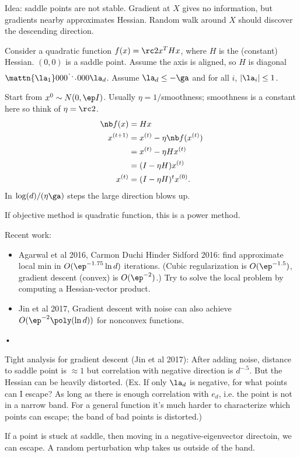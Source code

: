 Idea: saddle points are not stable. Gradient at $X$ gives no information, but gradients nearby approximates Hessian. Random walk around $X$ should discover the descending direction.

Consider a quadratic function $f(x) = \rc 2 x^THx$, where $H$ is the (constant) Hessian. $(0,0)$ is a saddle point. Assume the axis is aligned, so $H$ is diagonal $\mattn{\la_1}000{\ddots}000{\la_d}$.
Assume $\la_d\le -\ga$ and for all $i$, $|\la_i|\le 1$. 

Start from $x^0\sim N(0,\ep I)$.  Usually $\eta=1/$smoothness; smoothness is a constant here so think of $\eta=\rc2$.
\begin{align}
\nb f(x) &= Hx\\
x^{(t+1)}  &= x^{(t)} - \eta \nb f(x^{(t)}) \\
&= x^{(t) } - \eta Hx^{(t)}\\
&= (I-\eta H)x^{(t)}\\
x^{(t)} &= (I-\eta H)^t x^{(0)}.
\end{align}
In $\log (d)/(\eta\ga)$ steps the large direction blows up.


If objective method is quadratic function, this is a power method.

Recent work:
\begin{itemize}
\item
Agarwal et al 2016, Carmon Duchi Hinder Sidford 2016: find approximate local min in $O(\ep^{-1.75}\ln d)$ iterations. (Cubic regularization is $O(\ep^{-1.5})$, gradient descent (convex) is $O(\ep^{-2})$.) Try to solve the local problem by computing a Hessian-vector product.
\item
Jin et al 2017, Gradient descent with noise can also achieve $O(\ep^{-2} \poly(\ln d))$ for nonconvex functions.
\end{itemize}•

Tight analysis for gradient descent (Jin et al 2017): After adding noise, distance to saddle point is $\approx 1$ but correlation with negative direction is $d^{-.5}$. 
But the Hessian can be heavily distorted. (Ex. If only $\la_d$ is negative, for what points can I escape? As long as there is enough correlation with $e_d$, i.e. the point is not in a narrow band.  For a general function it's much harder to characterize which points can escape; the band of bad points is distorted.)

If a point is stuck at saddle, then moving in a negative-eigenvector directoin, we can escape. A random perturbation whp takes us outside of the band.

